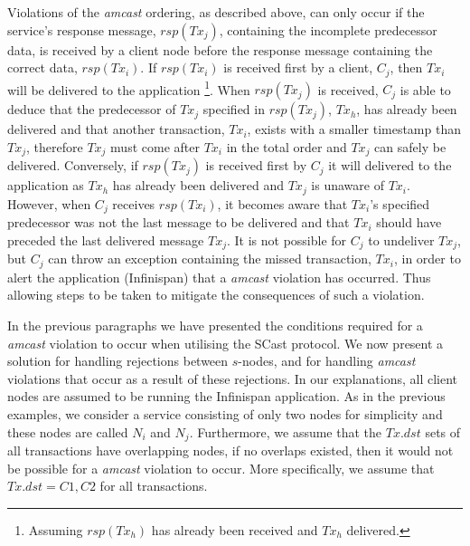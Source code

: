 Violations of the \emph{amcast} ordering, as described above, can only occur if the service's response message, $rsp(Tx_j)$, containing the incomplete predecessor data, is received by a client node before the response message containing the correct data, $rsp(Tx_i)$.  If $rsp(Tx_i)$ is received first by a client, $C_j$, then $Tx_i$ will be delivered to the application \footnote{Assuming $rsp(Tx_h)$ has already been received and $Tx_h$ delivered.}.  When $rsp(Tx_j)$ is received, $C_j$ is able to deduce that the predecessor of $Tx_j$ specified in $rsp(Tx_j)$, $Tx_h$, has already been delivered and that another transaction, $Tx_i$, exists with a smaller timestamp than $Tx_j$, therefore $Tx_j$ must come after $Tx_i$ in the total order and $Tx_j$ can safely be delivered. Conversely, if $rsp(Tx_j)$ is received first by $C_j$ it will delivered to the application as $Tx_h$ has already been delivered and $Tx_j$ is unaware of $Tx_i$.  However, when $C_j$ receives $rsp(Tx_i)$, it becomes aware that $Tx_i$'s specified predecessor was not the last message to be delivered and that $Tx_i$ should have preceded the last delivered message $Tx_j$.  It is not possible for $C_j$ to undeliver $Tx_j$, but $C_j$ can throw an exception containing the missed transaction, $Tx_i$, in order to alert the application (Infinispan) that a \emph{amcast} violation has occurred.  Thus allowing steps to be taken to mitigate the consequences of such a violation.  

In the previous paragraphs we have presented the conditions required for a \emph{amcast} violation to occur when utilising the \textsf{SCast} protocol.  We now present a solution for handling rejections between $s$-nodes, and for handling \emph{amcast} violations that occur as a result of these rejections.  In our explanations, all client nodes are assumed to be running the Infinispan application.  As in the previous examples, we consider a service consisting of only two nodes for simplicity and these nodes are called $N_i$ and $N_j$.  Furthermore, we assume that the $Tx.dst$ sets of all transactions have overlapping nodes, if no overlaps existed, then it would not be possible for a \emph{amcast} violation to occur.  More specifically, we assume that $Tx.dst = {C1,C2}$ for all transactions.  

